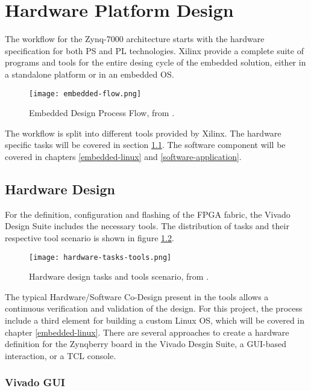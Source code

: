 
\chapter{Hardware Platform Design}

The workflow for the Zynq-7000 architecture starts with the hardware specification for both PS and
PL technologies. Xilinx provide a complete suite of programs and tools for the entire desing cycle
of the embedded solution, either in a standalone platform or in an embedded OS.

\begin{figure}[htp]
	\centering
	\texttt{[image: embedded-flow.png]}
	\caption{Embedded Design Process Flow, from \cite{UG1043}.} \label{fig:embedded-flow}
\end{figure}%

The workflow is split into different tools provided by Xilinx. The hardware specific tasks will be
covered in section \ref{hardware-design}. The software component will be covered in chapters
\ref{embedded-linux} and \ref{software-application}.

\section{Hardware Design} \label{hardware-design}

For the definition, configuration and flashing of the FPGA fabric, the Vivado Design Suite includes
the necessary tools. The distribution of tasks and their respective tool scenario is shown in figure
\ref{fig:hardware-tasks-tools}.

\begin{figure}[htp]
	\centering
	\texttt{[image: hardware-tasks-tools.png]}
	\caption{Hardware design tasks and tools scenario, from \cite{UG1043}.}
	\label{fig:hardware-tasks-tools}
\end{figure}%

The typical Hardware/Software Co-Design present in the tools allows a continuous verification and
validation of the design. For this project, the process include a third element for building a
custom Linux OS, which will be covered in chapter \ref{embedded-linux}. There are several approaches
to create a hardware definition for the Zynqberry board in the Vivado Desgin Suite, a GUI-based
interaction, or a TCL console.

\subsection{Vivado GUI}

